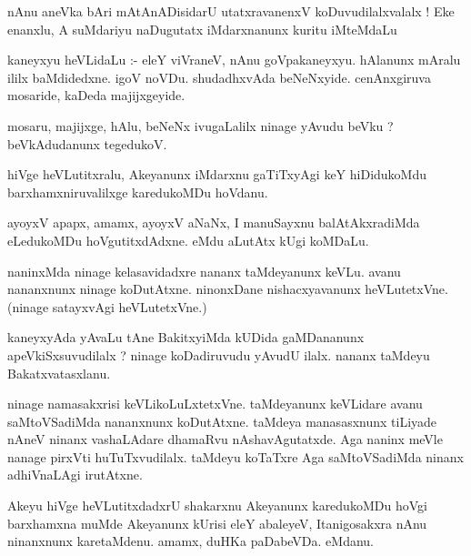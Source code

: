 \documentclass{article}
\begin{document}
\begin{mn}
nAnu aneVka bAri mAtAnADisidarU utatxravanenxV  koDuvudilalxvalalx !  Eke enanxlu,  
A  suMdariyu  naDugutatx  iMdarxnanunx  kuritu  iMteMdaLu
\end{mn}

\begin{mn}
kaneyxyu heVLidaLu :- eleY viVraneV, nAnu goVpakaneyxyu. hAlanunx  mAralu ililx  baMdidedxne.  
igoV  noVDu.  shudadhxvAda beNeNxyide.  cenAnxgiruva mosaride,  kaDeda majijxgeyide.
\end{mn}

\begin{mn}
mosaru, majijxge, hAlu, beNeNx ivugaLalilx ninage yAvudu beVku ?  beVkAdudanunx tegedukoV.
\end{mn}

\begin{mn}
hiVge heVLutitxralu, Akeyanunx  iMdarxnu gaTiTxyAgi keY hiDidukoMdu barxhamxniruvalilxge karedukoMDu hoVdanu.
\end{mn}

\begin{mn}
ayoyxV apapx, amamx, ayoyxV aNaNx, I manuSayxnu balAtAkxradiMda eLedukoMDu 
hoVgutitxdAdxne.  eMdu aLutAtx  kUgi koMDaLu.
\end{mn}

\begin{mn}
naninxMda ninage kelasavidadxre nananx taMdeyanunx keVLu.  avanu nananxnunx ninage 
koDutAtxne.  ninonxDane nishacxyavanunx heVLutetxVne. (ninage satayxvAgi heVLutetxVne.)
\end{mn}

\begin{mn}
kaneyxyAda yAvaLu  tAne BakitxyiMda kUDida gaMDananunx apeVkiSxsuvudilalx ?  
ninage koDadiruvudu yAvudU ilalx.  nananx taMdeyu Bakatxvatasxlanu.
\end{mn}

\begin{mn}
ninage namasakxrisi keVLikoLuLxtetxVne.  taMdeyanunx keVLidare avanu saMtoVSadiMda 
nananxnunx koDutAtxne. taMdeya manasasxnunx tiLiyade nAneV ninanx vashaLAdare  
dhamaRvu nAshavAgutatxde.  Aga naninx meVle nanage pirxVti  huTuTxvudilalx.  
taMdeyu koTaTxre Aga saMtoVSadiMda ninanx adhiVnaLAgi irutAtxne.
\end{mn}

\begin{mn}
Akeyu hiVge heVLutitxdadxrU  shakarxnu  Akeyanunx karedukoMDu hoVgi barxhamxna muMde Akeyanunx  
kUrisi eleY abaleyeV,  Itanigosakxra nAnu ninanxnunx karetaMdenu.  amamx, duHKa paDabeVDa.  eMdanu.
\end{mn}
\end{document}
